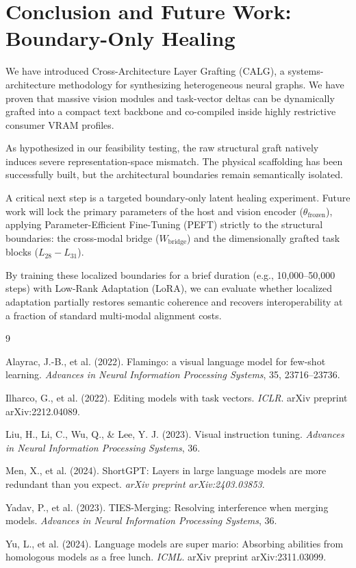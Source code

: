 \documentclass[11pt]{article}
\begin{document}
\section{Conclusion and Future Work: Boundary-Only Healing}
We have introduced Cross-Architecture Layer Grafting (CALG), a systems-architecture methodology for synthesizing heterogeneous neural graphs. We have proven that massive vision modules and task-vector deltas can be dynamically grafted into a compact text backbone and co-compiled inside highly restrictive consumer VRAM profiles.

As hypothesized in our feasibility testing, the raw structural graft natively induces severe representation-space mismatch. The physical scaffolding has been successfully built, but the architectural boundaries remain semantically isolated. 

A critical next step is a targeted boundary-only latent healing experiment. Future work will lock the primary parameters of the host and vision encoder ($\theta_{\text{frozen}}$), applying Parameter-Efficient Fine-Tuning (PEFT) strictly to the structural boundaries: the cross-modal bridge ($W_{\text{bridge}}$) and the dimensionally grafted task blocks ($L_{28}-L_{31}$). 

By training these localized boundaries for a brief duration (e.g., 10,000–50,000 steps) with Low-Rank Adaptation (LoRA), we can evaluate whether localized adaptation partially restores semantic coherence and recovers interoperability at a fraction of standard multi-modal alignment costs.

\begin{thebibliography}{9}

Alayrac, J.-B., et al. (2022).
\newblock Flamingo: a visual language model for few-shot learning.
\newblock \emph{Advances in Neural Information Processing Systems}, 35, 23716--23736.

Ilharco, G., et al. (2022).
\newblock Editing models with task vectors.
\newblock \emph{ICLR}. arXiv preprint arXiv:2212.04089.

Liu, H., Li, C., Wu, Q., \& Lee, Y. J. (2023).
\newblock Visual instruction tuning.
\newblock \emph{Advances in Neural Information Processing Systems}, 36.

Men, X., et al. (2024).
\newblock ShortGPT: Layers in large language models are more redundant than you expect.
\newblock \emph{arXiv preprint arXiv:2403.03853}.

Yadav, P., et al. (2023).
\newblock TIES-Merging: Resolving interference when merging models.
\newblock \emph{Advances in Neural Information Processing Systems}, 36.

Yu, L., et al. (2024).
\newblock Language models are super mario: Absorbing abilities from homologous models as a free lunch.
\newblock \emph{ICML}. arXiv preprint arXiv:2311.03099.

\end{thebibliography}
\end{document}
